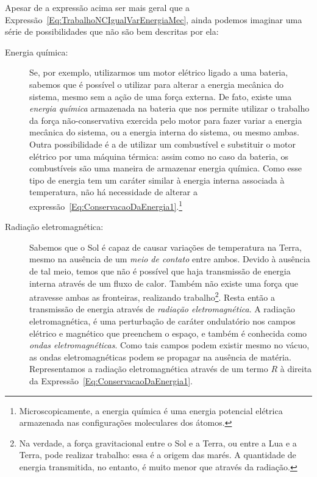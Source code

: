 Apesar de a expressão acima ser mais geral que a Expressão~\eqref{Eq:TrabalhoNCIgualVarEnergiaMec}, ainda podemos imaginar uma série de possibilidades que não são bem descritas por ela:
\begin{description}
    \item[Energia química:] Se, por exemplo, utilizarmos um motor elétrico ligado a uma bateria, sabemos que é possível o utilizar para alterar a energia mecânica do sistema, mesmo sem a ação de uma força externa. De fato, existe uma \emph{energia química} armazenada na bateria que nos permite utilizar o trabalho da força não-conservativa exercida pelo motor para fazer variar a energia mecânica do sistema, ou a energia interna do sistema, ou mesmo ambas. Outra possibilidade é a de utilizar um combustível e substituir o motor elétrico por uma máquina térmica: assim como no caso da bateria, os combustíveis são uma maneira de armazenar energia química. Como esse tipo de energia tem um caráter similar à energia interna associada à temperatura, não há necessidade de alterar a expressão~\eqref{Eq:ConservacaoDaEnergia1}.\footnote{Microscopicamente, a energia química é uma energia potencial elétrica armazenada nas configurações moleculares dos átomos.}

    \item[Radiação eletromagnética:] Sabemos que o Sol é capaz de causar variações de temperatura na Terra, mesmo na ausência de um \emph{meio de contato} entre ambos. Devido à ausência de tal meio, temos que não é possível que haja transmissão de energia interna através de um fluxo de calor. Também não existe uma força que atravesse ambas as fronteiras, realizando trabalho\footnote{Na verdade, a força gravitacional entre o Sol e a Terra, ou entre a Lua e a Terra, pode realizar trabalho: essa é a origem das marés. A quantidade de energia transmitida, no entanto, é muito menor que através da radiação.}. Resta então a transmissão de energia através de \emph{radiação eletromagnética}. A radiação eletromagnética, é uma perturbação de caráter ondulatório nos campos elétrico e magnético que preenchem o espaço, e também é conhecida como \emph{ondas eletromagnéticas}. Como tais campos podem existir mesmo no vácuo, as ondas eletromagnéticas podem se propagar na ausência de matéria. Representamos a radiação eletromagnética através de um termo $R$ à direita da Expressão~\eqref{Eq:ConservacaoDaEnergia1}.
\end{description}
 
